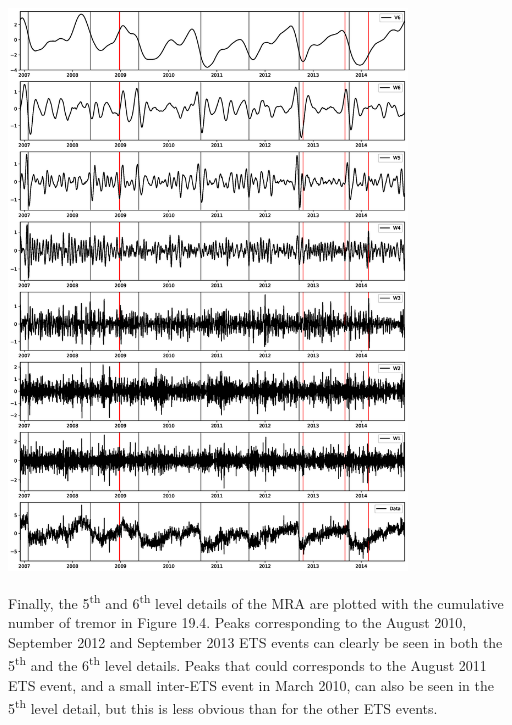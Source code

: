 \documentclass[main.tex]{subfiles}
\begin{document}
\begin{center}
\includegraphics[width=300pt]{Figures/slowslip_results/Figure_3.eps}
\captionsetup{type=figure}
\end{center}

Finally, the 5\textsuperscript{th} and 6\textsuperscript{th} level details of the MRA are plotted with the cumulative number of tremor in Figure 19.4. Peaks corresponding to the August 2010, September 2012 and September 2013 ETS events can clearly be seen in both the 5\textsuperscript{th} and the 6\textsuperscript{th} level details. Peaks that could corresponds to the August 2011 ETS event, and a small inter-ETS event in March 2010, can also be seen in the 5\textsuperscript{th} level detail, but this is less obvious than for the other ETS events.
\end{document}

